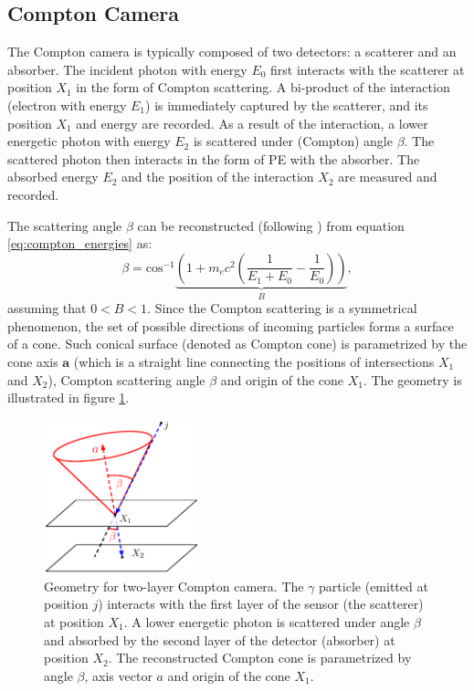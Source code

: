 \subsection{Compton Camera}%
The Compton camera is typically composed of two detectors: a scatterer and an absorber.
The incident photon with energy $E_{0}$ first interacts with the scatterer at position $X_{1}$ in the form of Compton scattering.
A bi-product of the interaction (electron with energy $E_{1}$) is immediately captured by the scatterer, and its position $X_{1}$ and energy are recorded.
As a result of the interaction, a lower energetic photon with energy $E_{2}$ is scattered under (Compton) angle $\beta$.
The scattered photon then interacts in the form of \ac{PE} with the absorber.
The absorbed energy $E_{2}$ and the position of the interaction $X_{2}$ are measured and recorded.

The scattering angle $\beta$ can be reconstructed (following \cite{baca2021gamma}) from equation \ref{eq:compton_energies} as:
\begin{equation}
  \beta = \mathrm{cos}^{-1} 
  \underset{B}{\underbrace{\left (
   1+m_{e}c^{2} \left( \frac{1}{E_{1}+E_{0}} - \frac{1}{E_{0}}\right )  \right )
  }},
    \label{eq:compton_beta_formula}
\end{equation}
assuming that $0<B<1$.
Since the Compton scattering is a symmetrical phenomenon,  the set of possible directions of incoming particles forms a surface of a cone.
Such conical surface (denoted as Compton cone) is parametrized by the cone axis $\mathbf{a}$ (which is a straight line connecting the positions of intersections $X_{1}$ and $X_{2}$), Compton scattering angle $\beta$ and origin of the cone $X_{1}$.
The geometry is illustrated in figure \ref{fig:compton_camera_geometry}.

\begin{figure}[!h]
  \centering
    \includegraphics[width=0.4\textwidth]{./fig/photos/compton_camera_modelll.eps}
    \caption{Geometry for two-layer Compton camera. The $\gamma$ particle (emitted at position $j$) interacts with the first layer of the sensor (the scatterer) at position $X_{1}$. A lower energetic photon is scattered under angle $\beta$ and absorbed by the second layer of the detector (absorber) at position $X_{2}$. The reconstructed Compton cone is parametrized by angle $\beta$, axis vector $a$ and origin of the cone $X_{1}$.}
    \label{fig:compton_camera_geometry}
\end{figure}
